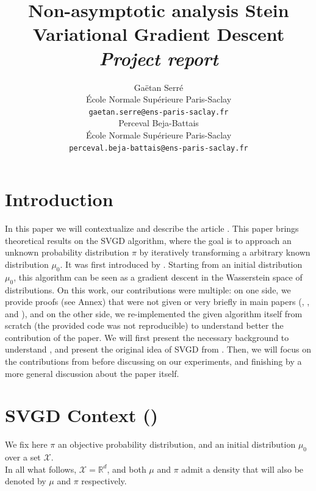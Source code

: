 \documentclass{article}
\title{Non-asymptotic analysis Stein Variational Gradient Descent\\
{\it Project report}}
\author{%
  Gaëtan Serré\\
  École Normale Supérieure Paris-Saclay\\
  \texttt{gaetan.serre@ens-paris-saclay.fr}\\
  \And Perceval Beja-Battais\\
  École Normale Supérieure Paris-Saclay\\
  \texttt{perceval.beja-battais@ens-paris-saclay.fr}\\
}
\newcommand{\R}{\mathbb{R}}
\newcommand{\X}{\mathcal{X}}
\begin{document}
\maketitle


\section{Introduction}
In this paper we will contextualize and describe the article \cite{main-paper}. This paper brings theoretical results on the SVGD algorithm, where the goal is to approach an unknown probability distribution $\pi$ by iteratively transforming a arbitrary known distribution $\mu_0$. It was first introduced by \cite{Original-SVGD}. Starting from an initial distribution $\mu_0$, this algorithm can be seen as a gradient descent in the Wasserstein space of distributions. On this work, our contributions were multiple: on one side, we provide proofs (see Annex) that were not given or very briefly in main papers (\cite{main-paper}, \cite{Original-SVGD}, and \cite{SVGD-flow}), and on the other side, we re-implemented the given algorithm itself from scratch (the provided code was not reproducible) to understand better the contribution of the paper. \newline
We will first present the necessary background to understand \cite{main-paper}, and present the original idea of SVGD from \cite{Original-SVGD}. Then, we will focus on the contributions from \cite{main-paper} before discussing on our experiments, and finishing by a more general discussion about the paper itself.

\section{SVGD Context (\cite{Original-SVGD})}
We fix here $\pi$ an objective probability distribution, and an initial distribution $\mu_0$
over a set $\X$.\\
In all what follows, $\X = \R^d$, and both $\mu$ and $\pi$ admit a
density that will also be denoted by $\mu$ and $\pi$ respectively.
\end{document}
